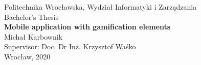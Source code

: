 \begin{titlepage}
\begin{center}
{\small\sc Politechnika Wrocławska, Wydział Informatyki i Zarządzania}\\
\vspace{2in}
{\LARGE Bachelor's Thesis}\\
\vspace{0.5in}
{\Huge\textbf{Mobile application with gamification elements}}\\
\vspace{1in}
{\Large Michał Karbownik}\\
\vspace{1in}
{\large Supervisor: Doc. Dr Inż. Krzysztof Waśko}\\
\vspace{2.5in}
Wrocław, 2020
\end{center}
\end{titlepage}